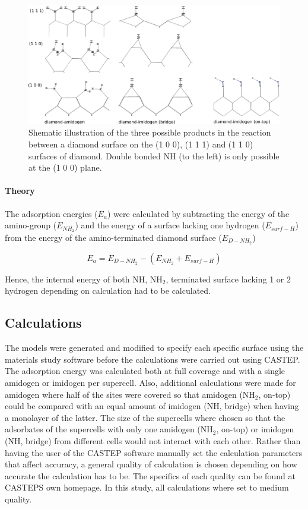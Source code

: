\documentclass[10pt,a4paper]{article}
\begin{document}
\begin{figure} \captionsetup{width=.8\linewidth} \caption{Shematic illustration of the three possible products in the reaction between a diamond surface on the (1 0 0), (1 1 1) and (1 1 0) surfaces of diamond. Double bonded NH (to the left) is only possible at the (1 0 0) plane.} \label{products}
%
\includegraphics[width=.8\linewidth]{pictures/products_new.png}
\end{figure}






\paragraph*{Theory}
The adsorption energies ($E_a$) were calculated by subtracting the energy of the amino-group ($E_{NH_2}$) and the energy of a surface lacking one hydrogen ($E_{surf-H}$) from the energy of the amino-terminated diamond surface ($E_{D-NH_2}$)


\begin{equation} E_{a} = E_{D-NH_2}-(E_{NH_2}+E_{surf-H}) \end{equation} 

Hence, the internal energy of both NH, NH$_2$, terminated surface lacking 1 or 2 hydrogen depending on calculation had to be calculated.

\subsection{Calculations}
The models were generated and modified to specify each specific surface using the materials study software before the calculations were carried out using CASTEP. The adsorption energy was calculated both at full coverage and with a single amidogen or imidogen per supercell. Also, additional calculations were made for amidogen where half of the sites were covered so that amidogen (NH$_2$, on-top) could be compared with an equal amount of imidogen (NH, bridge) when having a monolayer of the latter. The size of the supercells where chosen so that the adsorbates of the supercells with only one amidogen (NH$_2$, on-top) or imidogen (NH, bridge) from different cells would not interact with each other. Rather than having the user of the CASTEP software manually set the calculation parameters that affect accuracy, a general quality of calculation is chosen depending on how accurate the calculation has to be. The specifics of each quality can be found at CASTEPS own homepage. In this study, all calculations where set to medium quality.
\end{document}
